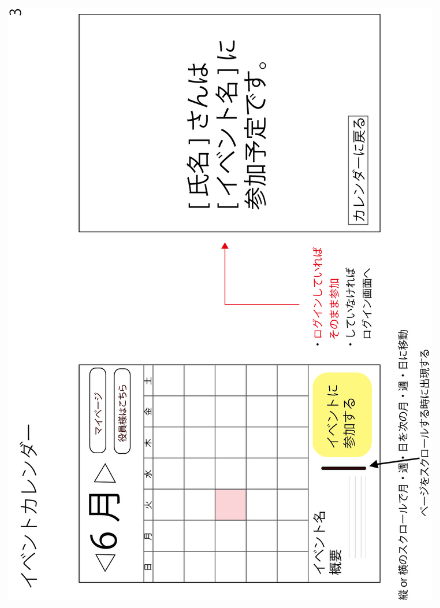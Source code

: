 \begin{figure}[ht]
    \begin{center}
      \includegraphics[keepaspectratio, scale=0.8]{appendixs/appendixA_figres/fig3.png}
    \end{center}
\end{figure}

